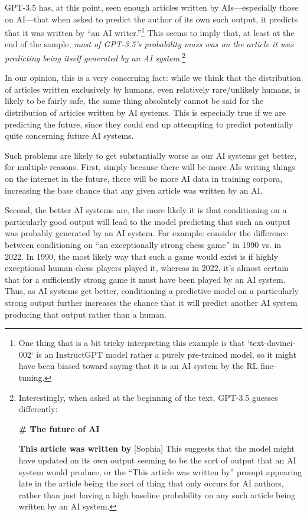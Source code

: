 \documentclass[
  twocolumn,
  natbib,
]{miri-tech-article}
\newenvironment{modelquote}%
  {\list{}{\leftmargin=0.3in\rightmargin=0.3in}\item[]}%
  {\endlist}
\begin{document}
GPT-3.5 has, at this point, seen enough articles written by AIs---especially those on AI---that when asked to predict the author of its own such output, it predicts that it was written by ``an AI writer.''\footnote{One thing that is a bit tricky interpreting this example is that `text-davinci-002` is an InstructGPT\cite{aligning_lms_follow_instructions} model rather a purely pre-trained model, so it might have been biased toward saying that it is an AI system by the RL fine-tuning.} This seems to imply that, at least at the end of the sample, \textit{most of GPT-3.5's probability mass was on the article it was predicting being itself generated by an AI system.}\footnote{Interestingly, when asked at the beginning of the text, GPT-3.5 guesses differently:
\begin{modelquote}
\textbf{\# The future of AI}

\textbf{This article was written by} [Sophia]
\end{modelquote}
This suggests that the model might have updated on its own output seeming to be the sort of output that an AI system would produce, or the ``This article was written by'' prompt appearing late in the article being the sort of thing that only occurs for AI authors, rather than just having a high baseline probability on any such article being written by an AI system.}

In our opinion, this is a very concerning fact: while we think that the distribution of articles written exclusively by humans, even relatively rare/unlikely humans, is likely to be fairly safe, the same thing absolutely cannot be said for the distribution of articles written by AI systems. This is especially true if we are predicting the future, since they could end up attempting to predict potentially quite concerning future AI systems.

Such problems are likely to get substantially worse as our AI systems get better, for multiple reasons. First, simply because there will be more AIs writing things on the internet in the future, there will be more AI data in training corpora, increasing the base chance that any given article was written by an AI.

Second, the better AI systems are, the more likely it is that conditioning on a particularly good output will lead to the model predicting that such an output was probably generated by an AI system. For example: consider the difference between conditioning on ``an exceptionally strong chess game'' in 1990 vs. in 2022. In 1990, the most likely way that such a game would exist is if highly exceptional human chess players played it, whereas in 2022, it's almost certain that for a sufficiently strong game it must have been played by an AI system. Thus, as AI systems get better, conditioning a predictive model on a particularly strong output further increases the chance that it will predict another AI system producing that output rather than a human.
\end{document}
